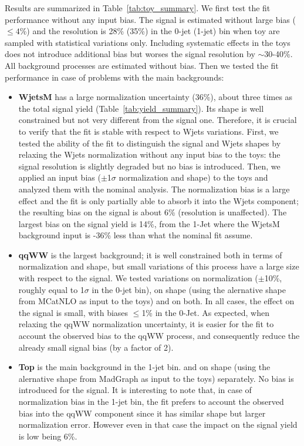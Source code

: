 Results are summarized in Table~\ref{tab:toy_summary}.
We first test the fit performance without any input bias. 
The signal is estimated without large bias ($\leq 4$\%) and the resolution is 28\% (35\%) in the 0-jet (1-jet) bin 
when toy are sampled with statistical variations only. Including systematic effects in the toys does not introduce
additional bias but worses the signal resolution by $\sim$30-40\%. All background processes are estimated without bias.
Then we tested the fit performance in case of problems with the main backgrounds:
\begin{itemize}

\item {\bf WjetsM} has a large normalization uncertainty (36\%), about three times as the total signal yield (Table~\ref{tab:yield_summary}). 
Its shape is well constrained but not very different from the signal one. 
Therefore, it is crucial to verify that the fit is stable with respect to Wjets variations.
First, we tested the ability of the fit to distinguish the signal and Wjets shapes by relaxing the Wjets normalization without any input bias to the toys: the signal resolution is slightly degraded but no bias is introduced. 
Then, we applied an input bias ($\pm$1$\sigma$ normalization and shape) to the toys and analyzed them with the nominal analysis. 
The normalization bias is a large effect and the fit is only partially able to absorb it into the Wjets component; 
the resulting bias on the signal is about 6\% (resolution is unaffected). 
The largest bias on the signal yield is 14\%, from the 1-Jet where the WjetsM background input is -36\% less than what 
the nominal fit assume.

\item {\bf qqWW} is the largest background; it is well constrained both in terms of normalization and shape, but small variations of this 
process have a large size with respect to the signal. 
We tested variations on normalization ($\pm$10\%, roughly equal to 1$\sigma$ in the 0-jet bin), 
on shape (using the alernative shape from MCatNLO as input to the toys) and on both. 
In all cases, the effect on the signal is small, with biases $\leq$1\% in the 0-Jet.  
As expected, when relaxing the qqWW normalization uncertainty, it is easier for the fit to account the observed bias to the qqWW process,
and consequently reduce the already small signal bias (by a factor of 2).

\item {\bf Top} is the main background in the 1-jet bin. 
and on shape 
(using the alernative shape from MadGraph as input to the toys) separately. No bias is introduced for the signal. 
It is interesting to note that, in case of normalization bias in the 1-jet bin, the fit prefers to account the observed bias 
into the qqWW component since it has similar shape but larger normalization error. However even in that case the impact 
on the signal yield is low being 6\%. 
\end{itemize}

